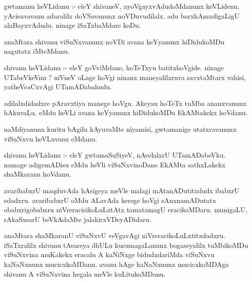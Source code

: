 \documentclass{article}
\begin{document}
\begin{mn}
gwtamanu  heVLidanu :- eleY  shivaneV,  ayoVgayxvAdudoMdanunx  keVLidenu.  yAcisuvavanu  adaralilx  
doVSavanunx  noVDuvudilalx.  adu  barxhAmxdigaLigU  alaBayxvAdudu.  ninage  iSaTxbaMdare  koDu.
\end{mn}

\begin{mn}
anaMtara  shivanu  viSuNxvanunx  noVDi  avana  keYyanunx  hiDidukoMDu  nagutatx  iMteMdanu. 
\end{mn}

\begin{mn}
shivanu  heVLidanu :- eleY  goVviMdane,  hoTeTxyu  batitxhoVgide.  ninage  UTabeVkeVnu ?  niVneV  
oLage  hoVgi  ninanx  maneyalilxruva  savxtaMtarx  vahisi,  yatheVcaCxvAgi  UTamADabahudu.
\end{mn}

\begin{mn}
adilalxdidadxre  pAravxtiya  manege  hoVgu.  Akeyau  hoTeTx tuMba  ananxvanunx  hAkuvaLu.  eMdu  
heVLi  avana  keYyanunx  hiDidukoMDu  EkAMtakekx  hoVdanu.
\end{mn}

\begin{mn}
naMdiyanunx  kuritu  bAgilu  kAyuvaMte  niyamisi,  gwtamanige  utatxravanunx  viSuNxvu  heVLuvanu  eMdanu.
\end{mn}

\begin{mn}
shivanu  heVLidanu :- eleY  gwtamaSuSiyeV,  nAvelalxrU  UTamADabeVku.  namage  adigemADisu  eMdu  
heVli  viSuNxvinoDane  EkAMta  sathxLakekx  shaMkaranu  hoVdanu.
\end{mn}

\begin{mn}
avaribabxrU  maqduvAda  hAsigeya  meVle  malagi  mAtanADutitxdudx  ibabxrU  edadxru.  avaribabxrU  
oMdu  ALavAda  kerege  hoVgi  sAnxnamADutatx  obabxrigobabxru  niVreracisikoLuLxtAtx  tamatamagU  
eracikoMDaru.  munigaLU,  rAkaSxsarU  beVkAdaMte  jalakirxVDeyADidaru.
\end{mn}

\begin{mn}
anaMtara  shaMkaranU  viSuNxvU  veVgavAgi  niVreracikoLuLxtitxdadxru.  iSaTxralilx  shivanu  tAvareya  dhULu  
kusumagaLanunx  bogaseyalilx  tuMbikoMDu  viSuNxvina  muKakekx  eracalu  A  kaNiNxge  bidudxdariMda  viSuNxvu  
kaNaNxnunx  mucicxkoMDanu.  avanu  hAge  kaNaNxnunx  mucicxkoMDAga  shivanu  A  viSuNxvina  hegala  meVle  kuLitukoMDanu.
\end{mn}
\end{document}
